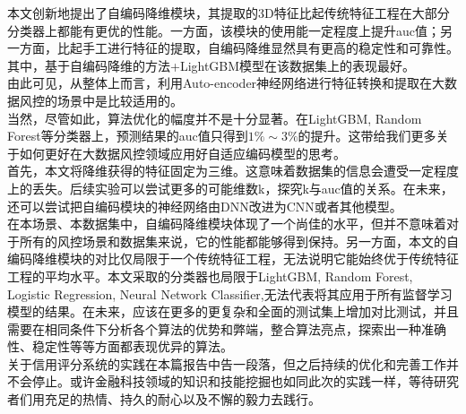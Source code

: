本文创新地提出了自编码降维模块，其提取的3D特征比起传统特征工程在大部分分类器上都能有更优的性能。一方面，该模块的使用能一定程度上提升auc值；另一方面，比起手工进行特征的提取，自编码降维显然具有更高的稳定性和可靠性。其中，基于自编码降维的方法+LightGBM模型在该数据集上的表现最好。\\

由此可见，从整体上而言，利用Auto-encoder神经网络进行特征转换和提取在大数据风控的场景中是比较适用的。\\

当然，尽管如此，算法优化的幅度并不是十分显著。在LightGBM, Random Forest等分类器上，预测结果的auc值只得到$1\%\sim3\%$的提升。这带给我们更多关于如何更好在大数据风控领域应用好自适应编码模型的思考。\\

首先，本文将降维获得的特征固定为三维。这意味着数据集的信息会遭受一定程度上的丢失。后续实验可以尝试更多的可能维数k，探究k与auc值的关系。在未来，还可以尝试把自编码模块的神经网络由DNN改进为CNN或者其他模型。\\

在本场景、本数据集中，自编码降维模块体现了一个尚佳的水平，但并不意味着对于所有的风控场景和数据集来说，它的性能都能够得到保持。另一方面，本文的自编码降维模块的对比仅局限于一个传统特征工程，无法说明它能始终优于传统特征工程的平均水平。本文采取的分类器也局限于LightGBM, Random Forest, Logistic Regression, Neural Network Classifier,无法代表将其应用于所有监督学习模型的结果。在未来，应该在更多的更复杂和全面的测试集上增加对比测试，并且需要在相同条件下分析各个算法的优势和弊端，整合算法亮点，探索出一种准确性、稳定性等等方面都表现优异的算法。\\

关于信用评分系统的实践在本篇报告中告一段落，但之后持续的优化和完善工作并不会停止。或许金融科技领域的知识和技能挖掘也如同此次的实践一样，等待研究者们用充足的热情、持久的耐心以及不懈的毅力去践行。
